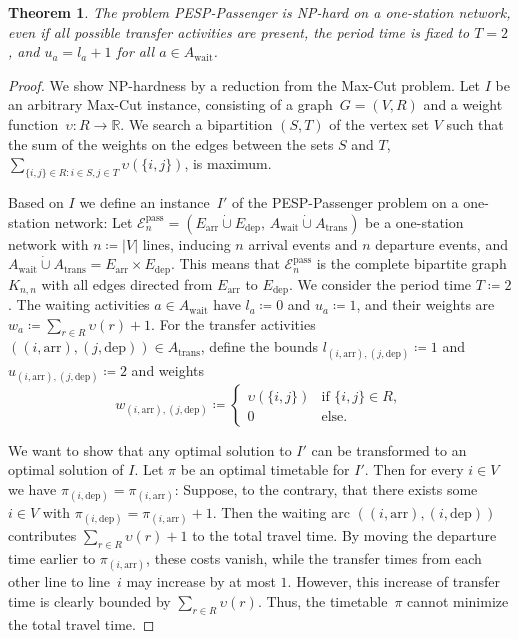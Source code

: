 \documentclass[11pt,a4paper]{article}
\newcommand{\dotcup}{\mathbin{\dot\cup}}
\newcommand{\arr}{\mathrm{arr}}
\newcommand{\dep}{\mathrm{dep}}
\newcommand{\wait}{\mathrm{wait}}
\newcommand{\transfer}{\mathrm{trans}}
\newcommand{\pesppassenger}{PESP-Passenger\xspace}
\newcommand{\osn}{one-station network\xspace}
\newcommand{\R}{\mathbb R}
\newcommand{\cE}{\mathcal{E}}
\newtheorem{theorem}{Theorem}[section]
\theoremstyle{definition}
\theoremstyle{remark}
\begin{document}
\begin{theorem} \label{NPhardPassengers}
	The problem \pesppassenger is NP-hard on a \osn, even if all possible transfer activities are present, the period time is fixed to $T = 2$, and $u_a = l_a + 1$ for all $a \in A_{\wait}$.
\end{theorem}

\begin{proof}
	We show NP-hardness by a reduction from the Max-Cut problem. Let $I$ be an arbitrary Max-Cut instance, consisting of a graph~$G=(V,R)$ and a weight function~$\upsilon \colon R \to \R$. We search a bipartition $(S, T)$ of the vertex set $V$ such that the sum of the weights on the edges between the sets $S$ and $T$, $\sum_{\{i, j\} \in R: i \in S, j \in T} \upsilon(\{i,j \})$, is maximum.
	
	Based on $I$ we define an instance~$I'$ of the \pesppassenger problem on a \osn: Let $\cE_n^{\mathrm{pass}} = (E_{\arr} \dotcup E_{\dep},\, A_{\wait} \dotcup A_{\transfer})$ be a \osn with $n \coloneqq |V|$ lines, inducing $n$ arrival events and $n$ departure events, and $A_{\wait} \dotcup A_{\transfer} = E_{\arr} \times E_{\dep}$. This means that $\cE_n^{\mathrm{pass}}$ is the complete bipartite graph $K_{n,n}$ with all edges directed from $E_\arr$ to $E_\dep$. We consider the period time $T \coloneqq 2$. The waiting activities $a \in A_{\wait}$ have $l_a \coloneqq 0$ and $u_a \coloneqq 1$, and their weights are $w_a \coloneqq \sum_{r \in R} \upsilon(r) + 1$. For the transfer activities $((i,\arr),(j,\dep)) \in A_{\transfer}$, define the bounds $l_{(i,\arr),(j,\dep)} \coloneqq 1$ and $u_{(i,\arr),(j,\dep)} \coloneqq 2$ and weights
	\[
	w_{(i,\arr),(j,\dep)} \coloneqq
	\begin{cases}
		\upsilon(\{i,j\}) &\text{if } \{i,j\} \in R, \\
		0 &\text{else.}
	\end{cases}
	\]
	
	We want to show that any optimal solution to $I'$ can be transformed to an optimal solution of $I$. 
	Let $\pi$ be an optimal timetable for $I'$. Then for every $i \in V$ we have $\pi_{(i,\dep)} = \pi_{(i,\arr)}$: Suppose, to the contrary, that there exists some $i \in V$ with $\pi_{(i,\dep)} = \pi_{(i,\arr)} + 1$. Then the waiting arc $((i,\arr),(i,\dep))$ contributes $\sum_{r \in R} \upsilon(r) + 1$ to the total travel time. By moving the departure time earlier to $\pi_{(i,\arr)}$, these costs vanish, while the transfer times from each other line to line~$i$ may increase by at most $1$. However, this increase of transfer time is clearly bounded by $\sum_{r \in R} \upsilon(r)$. Thus, the timetable~$\pi$ cannot minimize the total travel time.
    

\end{proof}
\end{document}
